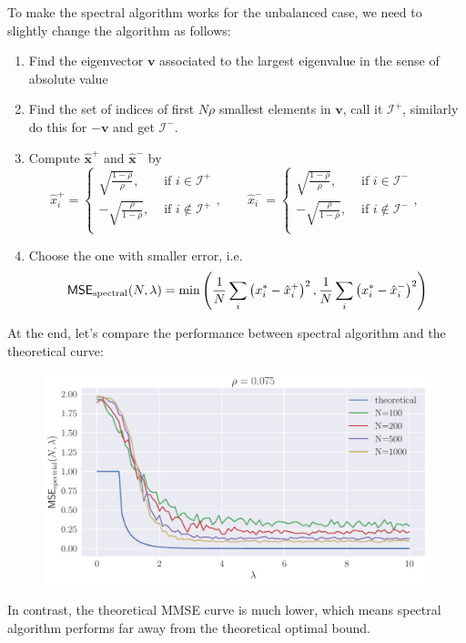 \documentclass[a4paper,oneside,12pt]{article}
\begin{document}
\begin{solution}
To make the spectral algorithm works for the unbalanced case, we need to slightly change the algorithm as follows:
\begin{enumerate}[(1)]
\item   Find the eigenvector $ \mathbf{v} $ associated to the largest eigenvalue in the sense of absolute value
\item   Find the set of indices of first $ N \rho $ smallest elements in $ \mathbf{v} $, call it $ \mathcal{I}^+ $, similarly do this for $ -\mathbf{v} $ and get $ \mathcal{I}^- $.
\item   Compute $ \hat{\mathbf{x}}^+ $ and $ \hat{\mathbf{x}}^- $ by
        \begin{equation*}
            \hat{x}_i^+ = 
            \begin{cases}
                \sqrt{ \frac{1-\rho}{\rho} }, &\text{ if } i \in \mathcal{I}^+\\
                -\sqrt{ \frac{\rho}{1-\rho} }, &\text{ if } i \notin \mathcal{I}^+\\
            \end{cases}, \qquad
            \hat{x}_i^- = 
            \begin{cases}
                \sqrt{ \frac{1-\rho}{\rho} }, &\text{ if } i \in \mathcal{I}^-\\
                -\sqrt{ \frac{\rho}{1-\rho} }, &\text{ if } i \notin \mathcal{I}^-\\
            \end{cases}, \qquad
        \end{equation*}
\item   Choose the one with smaller error, i.e.
        \begin{equation*}
            \mathsf{MSE}_{\mathrm{spectral}}(N, \lambda)
            = \min \left(  \frac{1}{N} \sum_i \left(  x_i^* - \hat{x}_i^+  \right)^2, \frac{1}{N} \sum_i \left(  x_i^* - \hat{x}_i^-  \right)^2  \right)
        \end{equation*}
\end{enumerate}


At the end, let's compare the performance between spectral algorithm and the theoretical curve:
\begin{figure}[H]
    \centering
    \includegraphics[width=400pt]{hw4/hw4_3.pdf}
\end{figure}
In contrast, the theoretical MMSE curve is much lower, which means spectral algorithm performs far away from the theoretical optimal bound.
\end{solution}
\end{document}
